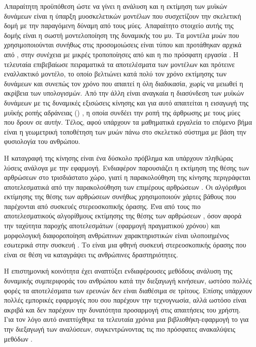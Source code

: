 Απαραίτητη προϋπόθεση ώστε να γίνει η ανάλυση και η εκτίμηση των μυϊκών δυνάμεων είναι η ύπαρξη μυοσκελετικών μοντέλων που συσχετίζουν την σκελετική δομή με την παραγόμενη δύναμη από τους μύες. Απαραίτητο στοιχείο αυτής της δομής είναι η σωστή μοντελοποίηση της δυναμικής του μυ. Τα μοντέλα μυών που χρησιμοποιούνται συνήθως στις προσομοιώσεις είναι τύπου  και προτάθηκαν αρχικά από \cite{zajac89}, στην συνέχεια με μικρές τροποποίησες από \cite{thelen03} και η πιο πρόσφατη εργασία \cite{millard13}. Η τελευταία επιβεβαίωσε πειραματικά τα αποτελέσματα των μοντέλων και πρότεινε εναλλακτικό μοντέλο, το οποίο βελτιώνει κατά πολύ τον χρόνο εκτίμησης των δυνάμεων και συνεπώς τον χρόνο που απαιτεί η όλη διαδικασία, χωρίς να μειωθεί η ακρίβεια των υπολογισμών. Από την άλλη είναι αναγκαία η διασύνδεση των μυϊκών δυνάμεων με τις δυναμικές εξισώσεις κίνησης και για αυτό απαιτείται η εισαγωγή της μυϊκής ροπής αδράνειας () \cite{delp95}, η οποία συνδέει την ροπή της άρθρωσης με τους μύες που δρουν σε αυτήν. Τέλος, αφού υπάρχουν τα μαθηματικά εργαλεία το επόμενο βήμα είναι η γεωμετρική τοποθέτηση των μυών πάνω στο σκελετικό σύστημα με βάση την φυσιολογία του ανθρώπου.

Η καταγραφή της κίνησης είναι ένα δύσκολο πρόβλημα και υπάρχουν πληθώρας λύσεις ανάλογα με την εφαρμογή. Ενδιαφέρον παρουσιάζει η εκτίμηση της θέσης των αρθρώσεων στο τρισδιάστατο χώρο, γιατί η παρακολούθηση της κίνησης περιγράφεται αποτελεσματικά από την παρακολούθηση των επιμέρους αρθρώσεων \cite{poppe07}. Οι αλγόριθμοι εκτίμησης της θέσης των αρθρώσεων συνήθως χρησιμοποιούν χάρτες βάθους που παρέχονται από συσκευές στερεοσκοπικής όρασης. Ένα από τους πιο αποτελεσματικούς αλγορίθμους εκτίμησης της θέσης των αρθρώσεων \cite{shotton11}, όσον αφορά την ταχύτητα παροχής αποτελεσμάτων (εφαρμογή πραγματικού χρόνου) και μορφολογική διαφοροποίηση ανθρώπινων χαρακτηριστικών είναι υλοποιημένος εσωτερικά στην συσκευή . Το  είναι μια φθηνή συσκευή στερεοσκοπικής όρασης που είναι σε θέση να καταγράψει τις ανθρώπινες δραστηριότητες.

Η επιστημονική κοινότητα έχει αναπτύξει ενδιαφέρουσες μεθόδους ανάλυση της δυναμικής συμπεριφοράς του ανθρώπου κατά την διεξαγωγή κινήσεων, ωστόσο πολλές φορές τα αποτελέσματα των ερευνών δεν είναι διαθέσιμα σε τρίτους. Επίσης υπάρχουν πολλές εμπορικές εφαρμογές που σου παρέχουν την τεχνογνωσία, αλλά ωστόσο είναι ακριβά και δεν παρέχουν την δυνατότητα προσαρμογή στις απαιτήσεις του χρήστη. Για τον λόγο αυτό αναπτύχθηκε τα τελευταία χρόνια μια βιβλιοθήκη-εφαρμογή το  για την διεξαγωγή των αναλύσεων, συγκεντρώνοντας τις πιο πρόσφατες ανακαλύψεις μεθόδων \cite{delp07}.

